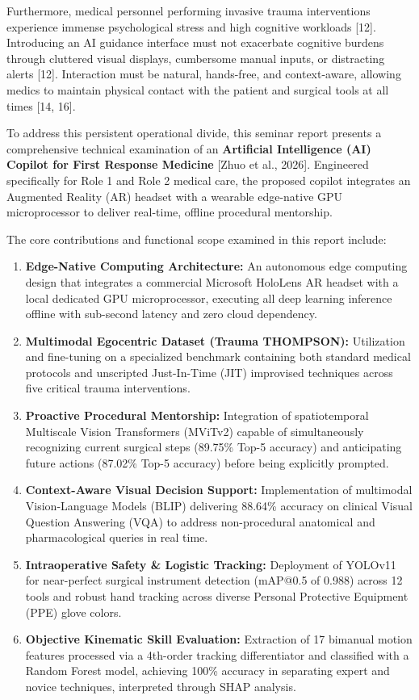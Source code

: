 \documentclass[12pt,a4paper]{report}
\begin{document}
Furthermore, medical personnel performing invasive trauma interventions experience immense psychological stress and high cognitive workloads [12]. Introducing an AI guidance interface must not exacerbate cognitive burdens through cluttered visual displays, cumbersome manual inputs, or distracting alerts [12]. Interaction must be natural, hands-free, and context-aware, allowing medics to maintain physical contact with the patient and surgical tools at all times [14, 16].

To address this persistent operational divide, this seminar report presents a comprehensive technical examination of an \textbf{Artificial Intelligence (AI) Copilot for First Response Medicine} [Zhuo et al., 2026]. Engineered specifically for Role 1 and Role 2 medical care, the proposed copilot integrates an Augmented Reality (AR) headset with a wearable edge-native GPU microprocessor to deliver real-time, offline procedural mentorship. 

\vspace{0.4cm}
\noindent
The core contributions and functional scope examined in this report include:
\begin{enumerate}\setlength{\itemsep}{0.6em}
    \item \textbf{Edge-Native Computing Architecture:} An autonomous edge computing design that integrates a commercial Microsoft HoloLens AR headset with a local dedicated GPU microprocessor, executing all deep learning inference offline with sub-second latency and zero cloud dependency.
    \item \textbf{Multimodal Egocentric Dataset (Trauma THOMPSON):} Utilization and fine-tuning on a specialized benchmark containing both standard medical protocols and unscripted Just-In-Time (JIT) improvised techniques across five critical trauma interventions.
    \item \textbf{Proactive Procedural Mentorship:} Integration of spatiotemporal Multiscale Vision Transformers (MViTv2) capable of simultaneously recognizing current surgical steps (89.75\% Top-5 accuracy) and anticipating future actions (87.02\% Top-5 accuracy) before being explicitly prompted.
    \item \textbf{Context-Aware Visual Decision Support:} Implementation of multimodal Vision-Language Models (BLIP) delivering 88.64\% accuracy on clinical Visual Question Answering (VQA) to address non-procedural anatomical and pharmacological queries in real time.
    \item \textbf{Intraoperative Safety \& Logistic Tracking:} Deployment of YOLOv11 for near-perfect surgical instrument detection (mAP@0.5 of 0.988) across 12 tools and robust hand tracking across diverse Personal Protective Equipment (PPE) glove colors.
    \item \textbf{Objective Kinematic Skill Evaluation:} Extraction of 17 bimanual motion features processed via a 4th-order tracking differentiator and classified with a Random Forest model, achieving 100\% accuracy in separating expert and novice techniques, interpreted through SHAP analysis.
\end{enumerate}
\end{document}
